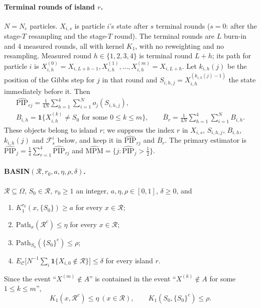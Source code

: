 \documentclass[11pt]{article}
\theoremstyle{remark}
\newcommand{\one}{\mathbf 1}
\newcommand{\R}{\mathcal R}
\newcommand{\C}{\mathcal C}
\newcommand{\PIP}{\widehat{\mathrm{PIP}}}
\newcommand{\Ec}{E_{\C}}
\begin{document}
\paragraph{Terminal rounds of island $r$.} $N=N_e$ particles. $X_{i,s}$ is particle $i$'s state after $s$ terminal rounds ($s=0$: after the stage-$T$ resampling and the stage-$T$ round). The terminal rounds are $L$ burn-in and $4$ measured rounds, all with kernel $K_1$, with no reweighting and no resampling. Measured round $h\in\{1,2,3,4\}$ is terminal round $L+h$; its path for particle $i$ is $X^{(0)}_{i,h}=X_{i,L+h-1},X^{(1)}_{i,h},\dots,X^{(m)}_{i,h}=X_{i,L+h}$. Let $k_{i,h}(j)$ be the position of the Gibbs step for $j$ in that round and $S_{i,h,j}=X^{(k_{i,h}(j)-1)}_{i,h}$ the state immediately before it. Then
\begin{gather*}
\PIP_{rj}=\frac1{4N}\sum_{h=1}^4\sum_{i=1}^N o_j(S_{i,h,j}),\\
B_{i,h}=\one\bigl\{X^{(k)}_{i,h}\neq S_0\text{ for some }0\le k\le m\bigr\},\qquad
\overline B_r=\frac1{4N}\sum_{h=1}^4\sum_{i=1}^N B_{i,h}.
\end{gather*}
These objects belong to island $r$; we suppress the index $r$ in $X_{i,s}$, $S_{i,h,j}$, $B_{i,h}$, $k_{i,h}(j)$ and $\mathcal F^i_s$ below, and keep it in $\PIP_{rj}$ and $\overline B_r$. The primary estimator is $\PIP_j=\tfrac14\sum_{r=1}^4\PIP_{rj}$ and $\widehat{\mathrm{MPM}}=\{j:\PIP_j>\tfrac12\}$.

\paragraph{BASIN$(\R,r_0,a,\eta,\rho,\delta)$.} $\R\subseteq\Omega$, $S_0\in\R$, $r_0\ge1$ an integer, $a,\eta,\rho\in[0,1]$, $\delta\ge0$, and
\begin{enumerate}[label=(B\arabic*)]
\item $K_1^{r_0}(x,\{S_0\})\ge a$ for every $x\in\R$;
\item $\mathrm{Path}_x(\R^c)\le\eta$ for every $x\in\R$;
\item $\mathrm{Path}_{S_0}(\{S_0\}^c)\le\rho$;
\item $\Ec\bigl[N^{-1}\sum_{i}\one\{X_{i,0}\notin\R\}\bigr]\le\delta$ for every island $r$.
\end{enumerate}
Since the event ``$X^{(m)}\notin A$'' is contained in the event ``$X^{(k)}\notin A$ for some $1\le k\le m$'',
\begin{equation}\label{eq:endpoint}
K_1(x,\R^c)\le\eta\ (x\in\R),\qquad K_1(S_0,\{S_0\}^c)\le\rho .
\end{equation}
\end{document}
